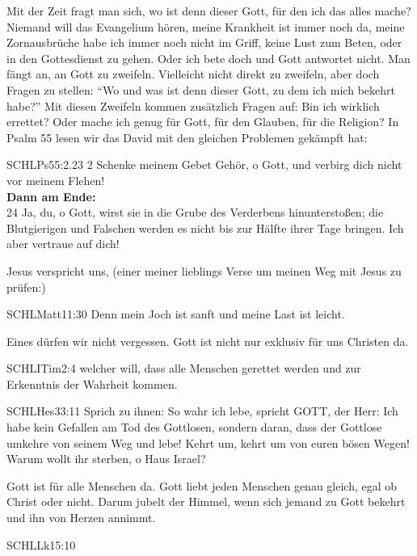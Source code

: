 \begin{otsblock}
        Mit der Zeit fragt man sich, wo ist denn dieser Gott, für den ich das alles mache? Niemand will das Evangelium hören, meine Krankheit ist immer noch da, meine Zornausbrüche habe ich immer noch nicht im Griff, keine Lust zum Beten, oder in den Gottesdienst zu gehen. Oder ich bete doch und Gott antwortet nicht. Man fängt an, an Gott zu zweifeln. Vielleicht nicht direkt zu zweifeln, aber doch Fragen zu stellen: \enquote{Wo und was ist denn dieser Gott, zu dem ich mich bekehrt habe?} Mit diesen Zweifeln kommen zusätzlich Fragen auf: Bin ich wirklich errettet? Oder mache ich genug für Gott, für den Glauben, für die Religion?
        In Psalm 55 lesen wir das David mit den gleichen Problemen gekämpft hat:
        \begin{bibelbox}{SCHL}{Ps}{55:2.23}
        2 Schenke meinem Gebet Gehör, o Gott, und verbirg dich nicht vor meinem Flehen!
        \\
        \textbf{Dann am Ende:}
        \\
        24 Ja, du, o Gott, wirst sie in die Grube des Verderbens hinunterstoßen; die Blutgierigen und Falschen werden es nicht bis zur Hälfte ihrer Tage bringen. Ich aber vertraue auf dich!
        \end{bibelbox}        
        Jesus verspricht uns, (einer meiner lieblings Verse um meinen Weg mit Jesus zu prüfen:)
        \begin{bibelbox}{SCHL}{Matt}{11:30}
            Denn mein Joch ist sanft und meine Last ist leicht.
        \end{bibelbox}
        \begin{otsblock}       
        Eines dürfen wir nicht vergessen. Gott ist nicht nur exklusiv für uns Christen da. 
        \begin{bibelbox}{SCHL}{ITim}{2:4}
        welcher will, dass alle Menschen gerettet werden und zur Erkenntnis der Wahrheit kommen.
        \end{bibelbox}
        \begin{bibelbox}{SCHL}{Hes}{33:11}
        Sprich zu ihnen: So wahr ich lebe, spricht GOTT, der Herr: Ich habe kein Gefallen am Tod des Gottlosen, sondern daran, dass der Gottlose umkehre von seinem Weg und lebe! Kehrt um, kehrt um von euren bösen Wegen! Warum wollt ihr sterben, o Haus Israel?
        \end{bibelbox}
        Gott ist für alle Menschen da. Gott liebt jeden Menschen genau gleich, egal ob Christ oder nicht. Darum jubelt der Himmel, wenn sich jemand zu Gott bekehrt und ihn von Herzen annimmt.
        \begin{bibelbox}{SCHL}{Lk}{15:10}

\end{bibelbox}
\end{otsblock}
\end{otsblock}

